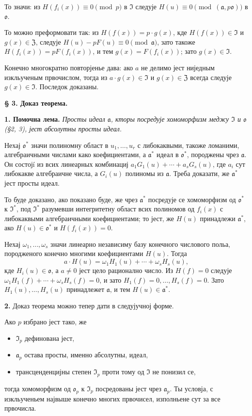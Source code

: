 \documentclass[11pt]{article}
\begin{document}
То значи: из \(H(f_i(x))\equiv0\pmod p\) в \(\mathfrak{I}\) следује \(H(u)\equiv0\pmod{(\mathfrak{a},p\mathfrak{o})}\) в \(\mathfrak{o}\).

То можно преформовати так: из \(H(f(x))=p\cdot g(x)\), кде \(H(f(x))\in\mathfrak{I}\) и \(g(x)\in\mathfrak{Z}\), следује \(H(u)-pF(u)\equiv0\pmod{\mathfrak{a}}\), зато такоже \(H(f_i(x))=pF(f_i(x))\), и тем \(g(x)=F(f_i(x))\); зато \(g(x)\in\mathfrak{I}\).

Конечно многократно повторјенье дава: ако \(a\) не делимо јест ниједным изкльученым првочислом, тогда из \(a\cdot g(x)\in\mathfrak{I}\) и \(g(x)\in\mathfrak{Z}\) всегда следује \(g(x)\in\mathfrak{I}\). Последок доказаны.

\bigskip
\noindent\textbf{§ 3. Доказ теорема.}

\smallskip
\noindent\textbf{1. Помочна лема.}
\textit{Просты идеал \(\mathfrak{a}\), кторы посредује хомоморфизм меджу \(\mathfrak{I}\) и \(\mathfrak{o}\) (§2, 3), јест абсолутны просты идеал.}

Нехај \(\mathfrak{o}^*\) значи полиномну област в \(u_1,\ldots,u_r\) с либокаквыми, такоже ломаними, алгебраичными числами како коефициентами, а \(\mathfrak{a}^*\) идеал в \(\mathfrak{o}^*\), породжены чрез \(\mathfrak{a}\). Он состојí из всих линеарных комбинациј \(a_1G_1(u)+\cdots+a_sG_s(u)\), где \(a_i\) сут либокакве алгебраичне числа, а \(G_i(u)\) полиномы из \(\mathfrak{a}\). Треба доказати, же \(\mathfrak{a}^*\) јест просты идеал.

То буде доказано, ако показано буде, же чрез \(\mathfrak{a}^*\) посредује се хомоморфизм од \(\mathfrak{o}^*\) к \(\mathfrak{I}^*\), под \(\mathfrak{I}^*\) разумевши интегритетну област всих полиномов од \(f_i(x)\) с либокаквыми алгебраичными коефициентами; то јест, же \(H(u)\) принадлежи \(\mathfrak{a}^*\), ако \(H(u)\in\mathfrak{o}^*\) и \(H(f_i(x))=0\).

Нехај \(\omega_1,\ldots,\omega_s\) значи линеарно независиму базу конечного числового польа, породженого конечно многими коефициентами \(H(u)\). Тогда
\[
a\cdot H(u)=\omega_1H_1(u)+\cdots+\omega_sH_s(u),
\]
кде \(H_i(u)\in\mathfrak{o}\), а \(a\ne0\) јест цело рационално число. Из \(H(f)=0\) следује \(\omega_1H_1(f)+\cdots+\omega_sH_s(f)=0\), и зато \(H_1(f)=0,\ldots,H_s(f)=0\). Зато \(H_1(u),\ldots,H_s(u)\) принадлежет \(\mathfrak{a}\), и тем \(H(u)\in\mathfrak{a}^*\).

\medskip\noindent\textbf{2.}
Доказ теорема можно тепер дати в следујучној форме.

Ако \(p\) избрано јест тако, же
\begin{itemize}
\item[И.] \(\mathfrak{I}_p\) дефинована јест,
\item[ИИ.] \(\mathfrak{a}_p\) остава просты, именно абсолутны, идеал,
\item[ИИИ.] трансценденцијны степен \(\mathfrak{I}_p\) проти тому од \(\mathfrak{I}\) не понизил се,
\end{itemize}
тогда хомоморфизм од \(\mathfrak{o}_p\) к \(\mathfrak{I}_p\) посредованы јест чрез \(\mathfrak{a}_p\). Ты условја, с изкльученьем највыше конечно многих првочисел, изполньене сут за все првочисла.
\end{document}
